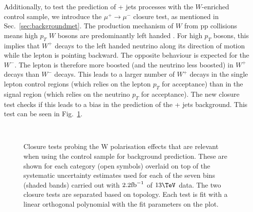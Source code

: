 Additionally, to 
test the prediction of \znunu + jets processes with
the $W$-enriched \mj control sample, we introduce the
$\mu^{+}\rightarrow\mu^{-}$ closure test, as mentioned in
Sec.~\ref{sec:backgroundmet}. The production mechanism of $W$ from pp
collisions means high $p_T$ $W$ bosons are predominantly left handed
\cite{WPol}.  For high $p_T$ bosons, this implies that $W^+$ decays to
the left handed neutrino along its direction of motion while the
lepton is pointing backward. The opposite behaviour is expected for
the $W^-$. The lepton is therefore more boosted (and the neutrino less
boosted) in $W^+$ decays than $W^-$ decays.  This leads to a larger
number of $W^+$ decays in the single lepton control regions (which
relies on the lepton $p_T$ for acceptance) than in the signal region
(which relies on the neutrino $p_T$ for acceptance). The new closure
test checks if this leads to a bias in the prediction of the \znunu +
jets background. This test can be seen in
Fig.~\ref{fig:closureMuPToMuM}.

\begin{figure}[h!]
  \begin{center}
    ~~
    \caption{Closure tests probing the W polarisation effects that are
    relevant when using the \mj control sample for background
    prediction. These are shown for each
      \njet category (open symbols) overlaid on top of the systematic
      uncertainty estimates used for each of the seven \scalht bins
      (shaded bands) carried out with $2.2\ifb$ of $13\tev$
      data. The two closure tests are separated based on topology.
      Each test is fit with a linear orthogonal polynomial with the
      fit parameters on the plot.}
    \label{fig:closureMuPToMuM}
  \end{center} 
\end{figure}

